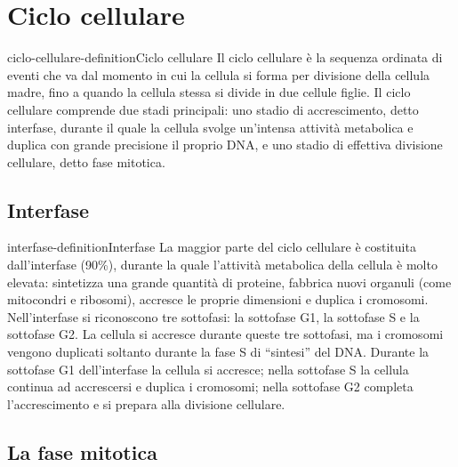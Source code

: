\documentclass[preview]{standalone}
\begin{document}
\genpage

\section{Ciclo cellulare}

\begin{snippetdefinition}{ciclo-cellulare-definition}{Ciclo cellulare}
    Il ciclo cellulare è la sequenza ordinata di eventi che va dal momento in cui la cellula si forma
    per divisione della cellula madre, fino a quando la cellula stessa si divide in due cellule figlie.
    Il ciclo cellulare comprende due stadi principali: uno stadio di accrescimento, detto interfase,
    durante il quale la cellula svolge un'intensa attività metabolica e duplica con grande
    precisione il proprio DNA, e uno stadio di effettiva divisione cellulare, detto fase mitotica.
\end{snippetdefinition}



\subsection{Interfase}

\begin{snippetdefinition}{interfase-definition}{Interfase}
    La maggior parte del ciclo cellulare è costituita dall'interfase (90\%), durante la quale l'attività
    metabolica della cellula è molto elevata: sintetizza una grande quantità di proteine, fabbrica
    nuovi organuli (come mitocondri e ribosomi), accresce le proprie dimensioni e duplica i
    cromosomi. Nell'interfase si riconoscono tre sottofasi: la sottofase G1, la sottofase S e la
    sottofase G2. La cellula si accresce durante queste tre sottofasi, ma i cromosomi vengono
    duplicati soltanto durante la fase S di “sintesi” del DNA. Durante la sottofase G1
    dell'interfase la cellula si accresce; nella sottofase S la cellula continua ad accrescersi e
    duplica i cromosomi; nella sottofase G2 completa l'accrescimento e si prepara alla divisione
    cellulare.
\end{snippetdefinition}

\subsection{La fase mitotica}
\end{document}

